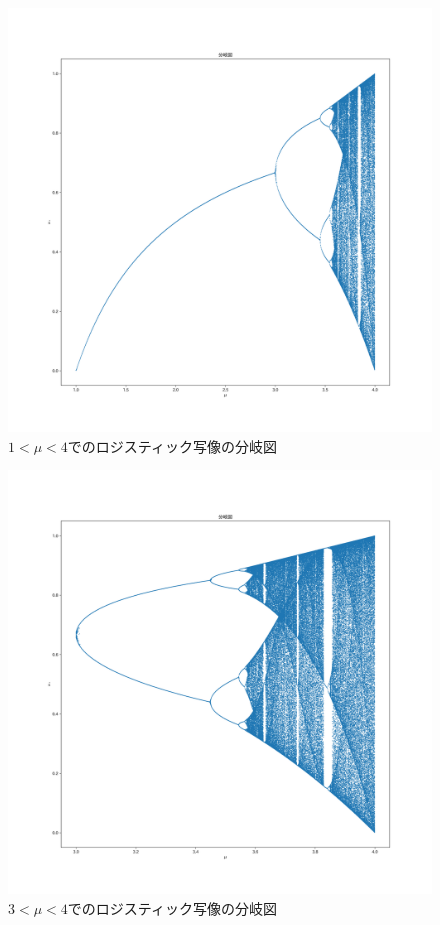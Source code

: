 \documentclass[a4paper, oneside]{jsarticle}
\begin{document}
\begin{figure}[h]
  \centering
  \includegraphics[width=150mm]{branch_1-4.png}
    \caption{$1<\mu<4$でのロジスティック写像の分岐図}
    \label{fig:branch1}
\end{figure}

\begin{figure}[h]
  \centering
  \includegraphics[width=150mm]{branch_3-4.png}
    \caption{$3<\mu<4$でのロジスティック写像の分岐図}
    \label{fig:branch2}
\end{figure}
\end{document}
